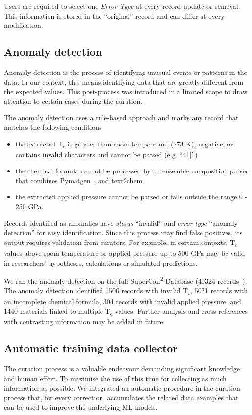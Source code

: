 Users are required to select one \emph{Error Type} at every record update or removal. 
This information is stored in the ``original'' record and can differ at every modification.


\subsection{Anomaly detection}
\label{subsec:anomaly-detection}
Anomaly detection is the process of identifying unusual events or patterns in the data. 
In our context, this means identifying data that are greatly different from the expected values.
This post-process was introduced in a limited scope to draw attention to certain cases during the curation.

The anomaly detection uses a rule-based approach and marks any record that matches the following conditions
\begin{itemize}
    \item the extracted T\textsubscript{c} is greater than room temperature (273 K), negative, or contains invalid characters and cannot be parsed (e.g. ``41]'')
    \item the chemical formula cannot be processed by an ensemble composition parser that combines Pymatgen~\cite{Ong2013}, and text2chem~\cite{kononova2019text} 
    \item the extracted applied pressure cannot be parsed or falls outside the range 0 - 250 GPa.
\end{itemize}

Records identified as anomalies have \emph{status} ``invalid'' and \emph{error type} ``anomaly detection'' for easy identification.
Since this process may find false positives, its output requires validation from curators. 
For example, in certain contexts, T\textsubscript{c} values above room temperature or applied pressure up to 500 GPa may be valid in researchers' hypotheses, calculations or simulated predictions. 

We ran the anomaly detection on the full SuperCon\textsuperscript{2} Database (40324 records~\cite{foppiano2023automatic}). 
The anomaly detection identified 1506 records with invalid T\textsubscript{c}, 5021 records with an incomplete chemical formula, 304 records with invalid applied pressure, and 1440 materials linked to multiple T\textsubscript{c} values. 
Further analysis and cross-references with contrasting information may be added in future. 

\subsection{Automatic training data collector}
\label{subsec:feedback-loop-training-data}
The curation process is a valuable endeavour demanding significant knowledge and human effort. 
To maximise the use of this time for collecting as much information as possible.
We integrated an automatic procedure in the curation process that, for every correction, accumulates the related data examples that can be used to improve the underlying ML models. 

